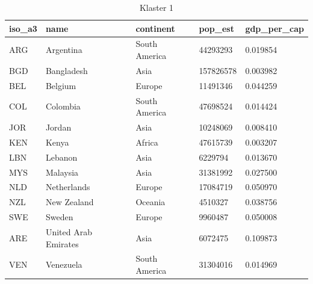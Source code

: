 \documentclass[11pt]{report}
\begin{document}
    \begin{table}[h!]
        \caption {Klaster 1} \label{tab:cl1}
        \begin{tabular}{lllll}
            \hline
            \multicolumn{1}{|l|}{iso\_a3} & \multicolumn{1}{l|}{name} & \multicolumn{1}{l|}{continent} & \multicolumn{1}{l|}{pop\_est} & \multicolumn{1}{l|}{gdp\_per\_cap} \\ \hline
            ARG                           & Argentina                 & South America                  & 44293293                      & 0.019854                           \\
            BGD                           & Bangladesh                & Asia                           & 157826578                     & 0.003982                           \\
            BEL                           & Belgium                   & Europe                         & 11491346                      & 0.044259                           \\
            COL                           & Colombia                  & South America                  & 47698524                      & 0.014424                           \\
            JOR                           & Jordan                    & Asia                           & 10248069                      & 0.008410                           \\
            KEN                           & Kenya                     & Africa                         & 47615739                      & 0.003207                           \\
            LBN                           & Lebanon                   & Asia                           & 6229794                       & 0.013670                           \\
            MYS                           & Malaysia                  & Asia                           & 31381992                      & 0.027500                           \\
            NLD                           & Netherlands               & Europe                         & 17084719                      & 0.050970                           \\
            NZL                           & New Zealand               & Oceania                        & 4510327                       & 0.038756                           \\
            SWE                           & Sweden                    & Europe                         & 9960487                       & 0.050008                           \\
            ARE                           & United Arab Emirates      & Asia                           & 6072475                       & 0.109873                           \\
            VEN                           & Venezuela                 & South America                  & 31304016                      & 0.014969
        \end{tabular}
    \end{table}
\end{document}
